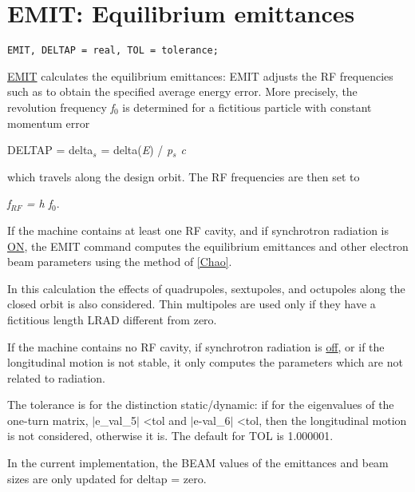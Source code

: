 
\chapter{EMIT: Equilibrium emittances} 

\begin{verbatim}
EMIT, DELTAP = real, TOL = tolerance;
\end{verbatim}

\href{emit}{EMIT} calculates the equilibrium emittances: 
EMIT adjusts the RF frequencies such as to obtain the specified average
energy error. More precisely, the revolution frequency \textit{f$_0$} is
determined for a fictitious particle with constant momentum error  
 
DELTAP = delta$_\textit{s}$ = delta(\textit{E}) / \textit{p$_s$ c}

which travels along the design orbit. The RF frequencies are then set to  

\textit{f$_{RF}$ = h f$_0$}. 

If the machine contains at least one RF cavity, and if synchrotron
radiation is \href{../Introduction/beam.html#radiate}{ON}, the EMIT
command computes the equilibrium emittances and other electron beam
parameters using the method of
\href{../Introduction/bibliography.html#chao}{[Chao]}. 

In this calculation the effects of quadrupoles, sextupoles, and
octupoles along the closed orbit is also considered. Thin multipoles are
used only if they have a fictitious length LRAD  different from zero.  

If the machine contains no RF cavity, if synchrotron radiation is
\href{../Introduction/beam.html#radiate}{off}, or if the longitudinal
motion is not stable, it only computes the parameters which are not
related to radiation.  

The tolerance is for the distinction static/dynamic: if for the
eigenvalues of the one-turn matrix, $|$e\_val\_5$|$ \textless tol and
$|$e-val\_6$|$ \textless tol, then the longitudinal motion is not
considered, otherwise it is. The default for TOL is 1.000001.  
 
In the current implementation, the BEAM values of the emittances and
beam sizes are only updated for deltap = zero.  

